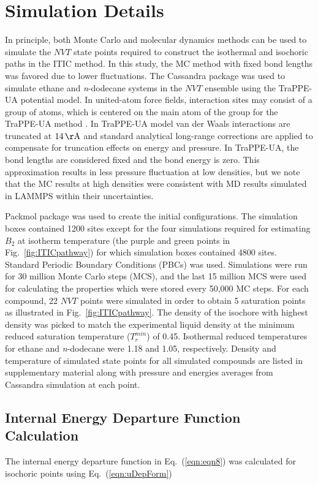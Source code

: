 \documentclass[5p,times]{elsarticle}
\begin{document}
\section{Simulation Details} \label{sec:SimDetail}
In principle, both Monte Carlo and molecular dynamics methods can be used to simulate the $NVT$ state points required to construct the isothermal and isochoric paths in the ITIC method. In this study, the MC method with fixed bond lengths was favored due to lower fluctuations. The Cassandra package \cite{Shah2017} was used to simulate ethane and \textit{n}-dodecane systems in the $NVT$ ensemble using the TraPPE-UA potential model. In united-atom force fields, interaction sites may consist of a group of atoms, which is centered on the main atom of the group for the TraPPE-UA method \cite{Smit1998}. In TraPPE-UA model van der Waals interactions are truncated at $14\,\mathrm{\AA}$ and standard analytical long-range corrections are applied to compensate for truncation effects on energy and pressure\cite{allen2017}. In TraPPE-UA, the bond lengths are considered fixed and the bond energy is zero. This approximation results in less pressure fluctuation at low densities, but we note that the MC results at high densities were consistent with MD results simulated in LAMMPS \cite{Plimpton2007} within their uncertainties.

Packmol \cite{martinez2009packmol} package was used to create the initial configurations. The simulation boxes contained 1200 sites except for the four simulations required for estimating $B_2$ at isotherm temperature (the purple and green points in Fig.~\ref{fig:ITICpathway}) for which simulation boxes contained 4800 sites. Standard Periodic Boundary Conditions (PBCs) was used. Simulations were run for 30 million Monte Carlo steps (MCS), and the last 15 million MCS were used for calculating the properties which were stored every 50,000 MC steps. For each compound, 22 $NVT$ points were simulated in order to obtain 5 saturation points as illustrated in Fig.~\ref{fig:ITICpathway}. The density of the isochore with highest density was picked to match the experimental liquid density at the minimum reduced saturation temperature ($T_r^{min}$) of 0.45. Isothermal reduced temperatures for ethane and \textit{n}-dodecane were 1.18 and 1.05, respectively. Density and temperature of simulated state points for all simulated compounds are listed in supplementary material along with pressure and energies averages from Cassandra simulation at each point.

\subsection{Internal Energy Departure Function Calculation}\label{sec:udepCalc}
The internal energy departure function in Eq.~(\ref{eqn:eqn8}) was calculated for isochoric points using Eq.~(\ref{eqn:uDepForm})
\end{document}
